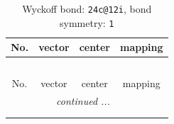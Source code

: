 \documentclass[fleqn,8pt]{jsarticle}
\begin{document}
\renewcommand{\arraystretch}{1.2}
\begin{longtable}{cccc}
\caption{Wyckoff bond: {\tt 24c@12i}, bond symmetry: {\tt 1}}
 \\
 \hline \hline
No. & vector & center & mapping \\ \hline \endfirsthead

\multicolumn{3}{l}{\tablename\ \thetable{}} \\
 \hline \hline
No. & vector & center & mapping \\ \hline \endhead

 \hline \hline
\multicolumn{3}{r}{\footnotesize\it continued ...} \\ \endfoot

 \hline \hline
\multicolumn{3}{r}{} \\ \endlastfoot


\end{longtable}
\end{document}

